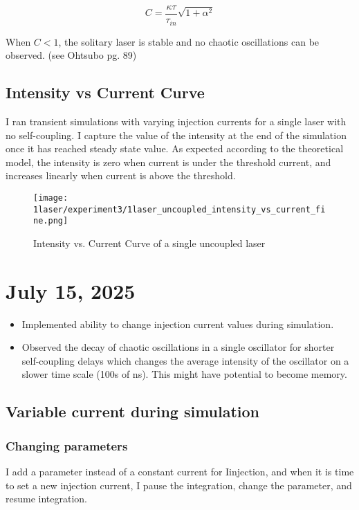 \documentclass[11pt,letterpaper]{article}
\begin{document}
\begin{equation}
C = \frac{\kappa \tau}{\tau_{in}} \sqrt{1 + \alpha^2}
\end{equation}

When $C < 1$, the solitary laser is stable and no chaotic oscillations can be observed. (see Ohtsubo pg. 89)

\subsection{Intensity vs Current Curve}

I ran transient simulations with varying injection currents for a single laser with no self-coupling. I capture the value of the intensity at the end of the simulation once it has reached steady state value. As expected according to the theoretical model, the intensity is zero when current is under the threshold current, and increases linearly when current is above the threshold.

\begin{figure}[H]
\centering
\texttt{[image: 1laser/experiment3/1laser\_uncoupled\_intensity\_vs\_current\_fine.png]}
\caption{Intensity vs. Current Curve of a single uncoupled laser\label{intensitycurveuncoupled}}
\end{figure}

\section{July 15, 2025}
\begin{itemize}
    \item Implemented ability to change injection current values during simulation.
    \item Observed the decay of chaotic oscillations in a single oscillator for shorter self-coupling delays which changes the average intensity of the oscillator on a slower time scale (100s of ns). This might have potential to become memory.
\end{itemize}

\subsection{Variable current during simulation}
\subsubsection{Changing parameters}
I add a parameter instead of a constant current for I\textunderscore injection, and when it is time to set a new injection current, I pause the integration, change the parameter, and resume integration.
\end{document}
